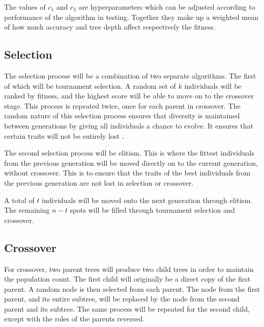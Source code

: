 \documentclass[12pt]{article}
\begin{document}
The values of $c_1$ and $c_2$ are hyperparameters which can be adjusted according to performance of the algorithm in testing. Together they make up a weighted mean of how much accuracy and tree depth affect respectively the fitness.

\subsection{Selection}

The selection process will be a combination of two separate algorithms. The first of which will be tournament selection. A random set of $k$ individuals will be ranked by fitness, and the highest score will be able to move on to the crossover stage. This process is repeated twice, once for each parent in crossover. The random nature of this selection process ensures that diversity is maintained between generations by giving all individuals a chance to evolve. It ensures that certain traits will not be entirely lost \autocite{blickle_1997}.

The second selection process will be elitism. This is where the fittest individuals from the previous generation will be moved directly on to the current generation, without crossover. This is to ensure that the traits of the best individuals from the previous generation are not lost in selection or crossover.

A total of $t$ individuals will be moved onto the next generation through elitism. The remaining $n - t$ spots will be filled through tournament selection and crossover.

\subsection{Crossover}

For crossover, two parent trees will produce two child trees in order to maintain the population count. The first child will originally be a direct copy of the first parent. A random node is then selected from each parent. The node from the first parent, and its entire subtree, will be replaced by the node from the second parent and its subtree. The same process will be repeated for the second child, except with the roles of the parents reversed.
\end{document}
